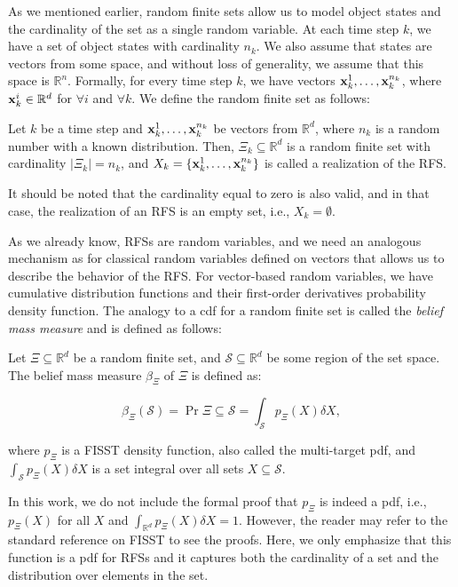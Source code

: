 As we mentioned earlier, random finite sets allow us to model object states and the cardinality of the set as a single random variable. At each time step $k$, we have a set of object states with cardinality $n_k$. We also assume that states are vectors from some space, and without loss of generality, we assume that this space is $\mathbb{R}^n$. Formally, for every time step $k$, we have vectors ${\vecat{x}{k}^{1}, \ldots, \vecat{x}{k}^{n_k}}$, where $\vecat{x}{k}^{i} \in \mathbb{R}^d$ for $\forall i$ and $\forall k$. We define the random finite set as follows:

\begin{definition}
    Let $k$ be a time step and ${\vecat{x}{k}^{1}, \ldots, \vecat{x}{k}^{n_k}}$ be vectors from $\mathbb{R}^d$, where $n_k$ is a random number with a known distribution. Then, $\Xi_k \subseteq \mathbb{R}^d$ is a random finite set with cardinality $|\Xi_k| = n_k$, and $X_k = \{\vecat{x}{k}^{1}, \ldots, \vecat{x}{k}^{n_k}\}$ is called a realization of the RFS.
\end{definition}


It should be noted that the cardinality equal to zero is also valid, and in that case, the realization of an RFS is an empty set, i.e., $X_k = \emptyset$.

As we already know, RFSs are random variables, and we need an analogous mechanism as for classical random variables defined on vectors that allows us to describe the behavior of the RFS. For vector-based random variables, we have cumulative distribution functions and their first-order derivatives probability density function. The analogy to a cdf for a random finite set is called the \textit{belief mass measure} and is defined as follows:

\begin{definition}
    Let $\Xi \subseteq \mathbb{R}^d$ be a random finite set, and $\mathcal{S} \subseteq \mathbb{R}^d$ be some region of the set space. The belief mass measure $\beta_\Xi$ of $\Xi$ is defined as:

    \begin{equation}
        \beta_\Xi(\mathcal{S})
        = \Pr{\Xi \subseteq \mathcal{S}}
        = \int_\mathcal{S} p_\Xi(X)\delta X,
    \end{equation}

    where $p_\Xi$ is a FISST density function, also called the multi-target pdf, and $\int_\mathcal{S} p_\Xi(X)\delta X$ is a set integral over all sets $X \subseteq \mathcal{S}$.
\end{definition}

In this work, we do not include the formal proof that $p_\Xi$ is indeed a pdf, i.e., $p_\Xi(X)$ for all $X$ and $\int_{\mathbb{R}^d} p_\Xi(X)\delta X = 1$. However, the reader may refer to the standard reference on FISST \cite{mahlerStatisticalMultisourcemultitargetInformation2007} to see the proofs. Here, we only emphasize that this function is a pdf for RFSs and it captures both the cardinality of a set and the distribution over elements in the set.
